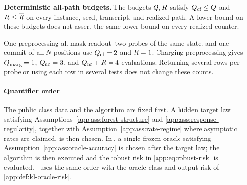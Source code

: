 \begin{definition}[\textcolor{red}{Resources and all-path budgets}]
\smallskip
\noindent\textbf{Deterministic all-path budgets.}
The budgets $\overline Q,\overline R$ satisfy
$Q_{\mathrm{cf}}\le\overline Q$ and $R\le\overline R$
on every instance, seed, transcript, and realized path.  A lower bound on
these budgets does not assert the same lower bound on every realized counter.
\end{definition}

\begin{example*}
One preprocessing all-mask readout, two probes of the same state, and
one commit of all $N$ positions use
$Q_{\mathrm{cf}}=2$ and $R=1$.
Charging preprocessing gives $Q_{\mathrm{marg}}=1$,
$Q_{\mathrm{nc}}=3$, and $Q_{\mathrm{nc}}+R=4$ evaluations.
Returning several rows per probe or using each row in several tests
does not change these counts.
\end{example*}

\paragraph{Quantifier order.}
The public class data and the algorithm
are fixed first.  A hidden target law satisfying
Assumptions~\ref{app:ass:forest-structure} and
\ref{app:ass:response-regularity}, together with
Assumption~\ref{app:ass:rate-regime} where asymptotic rates are claimed, is
then chosen. In \HellingerCase, a single frozen oracle satisfying
Assumption~\ref{app:ass:oracle-accuracy} is chosen after the target law; the algorithm
is then executed and the robust risk in \eqref{app:eq:robust-risk} is evaluated.
\KLCaseTitle\ uses the same order with the oracle class and output risk
of \cref{app:def:kl-oracle-risk}.
